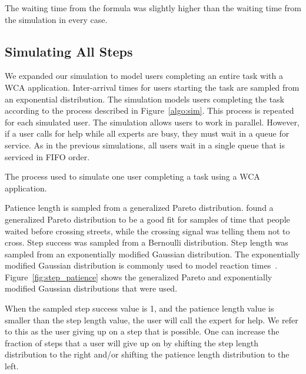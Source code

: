 The waiting time from the formula was slightly higher than the waiting time from
the simulation in every case.

\subsection{Simulating All Steps}

We expanded our simulation to model users completing an entire task with a WCA
application.
Inter-arrival times for users starting the task are sampled from an exponential
distribution.
The simulation models users completing the task according to the process
described in Figure~\ref{algo:sim}.
This process is repeated for each simulated user.
The simulation allows users to work in parallel.
However, if a user calls for help while all experts are busy, they must wait in
a queue for service.
As in the previous simulations, all users wait in a single queue that is
serviced in FIFO order.

\begin{algorithm}[h]
  \caption{
    The process used to simulate one user completing a task using a WCA
    application.
  }\label{algo:sim}
\end{algorithm}

Patience length is sampled from a generalized Pareto distribution.
\citet{patience} found a generalized Pareto distribution to be a good fit for
samples of time that people waited before crossing streets, while the crossing
signal was telling them not to cross.
Step success was sampled from a Bernoulli distribution.
Step length was sampled from an exponentially modified Gaussian distribution.
The exponentially modified Gaussian distribution is commonly used to model
reaction times~\cite{dawson1988fitting}.
Figure~\ref{fig:step_patience} shows the generalized Pareto and exponentially
modified Gaussian distributions that were used.

When the sampled step success value is 1, and the patience length value is
smaller than the step length value, the user will call the expert for help.
We refer to this as the user giving up on a step that is possible.
One can increase the fraction of steps that a user will give up on by shifting
the step length distribution to the right and/or shifting the patience length
distribution to the left.


